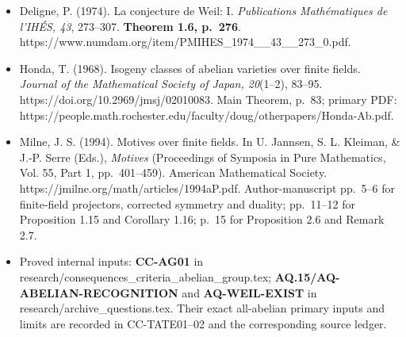 \begin{itemize}
\tightlist
\item
  Deligne, P. (1974). La conjecture de Weil: I. \emph{Publications
  Mathématiques de l'IHÉS, 43}, 273--307. \textbf{Theorem 1.6, p.~276}.
  https://www.numdam.org/item/PMIHES\_1974\_\_43\_\_273\_0.pdf.
\item
  Honda, T. (1968). Isogeny classes of abelian varieties over finite
  fields. \emph{Journal of the Mathematical Society of Japan, 20}(1--2),
  83--95. https://doi.org/10.2969/jmsj/02010083. Main Theorem, p.~83;
  primary PDF:
  https://people.math.rochester.edu/faculty/doug/otherpapers/Honda-Ab.pdf.
\item
  Milne, J. S. (1994). Motives over finite fields. In U. Jannsen, S. L.
  Kleiman, \& J.-P. Serre (Eds.), \emph{Motives} (Proceedings of
  Symposia in Pure Mathematics, Vol. 55, Part 1, pp.~401--459). American
  Mathematical Society. https://jmilne.org/math/articles/1994aP.pdf.
  Author-manuscript pp.~5--6 for finite-field projectors, corrected
  symmetry and duality; pp.~11--12 for Proposition 1.15 and Corollary
  1.16; p.~15 for Proposition 2.6 and Remark 2.7.
\item
  Proved internal inputs: \textbf{CC-AG01} in
  research/consequences\_criteria\_abelian\_group.tex;
  \textbf{AQ.15/AQ-ABELIAN-RECOGNITION} and \textbf{AQ-WEIL-EXIST} in
  research/archive\_questions.tex. Their exact all-abelian primary
  inputs and limits are recorded in CC-TATE01--02 and the corresponding
  source ledger.
\end{itemize}
